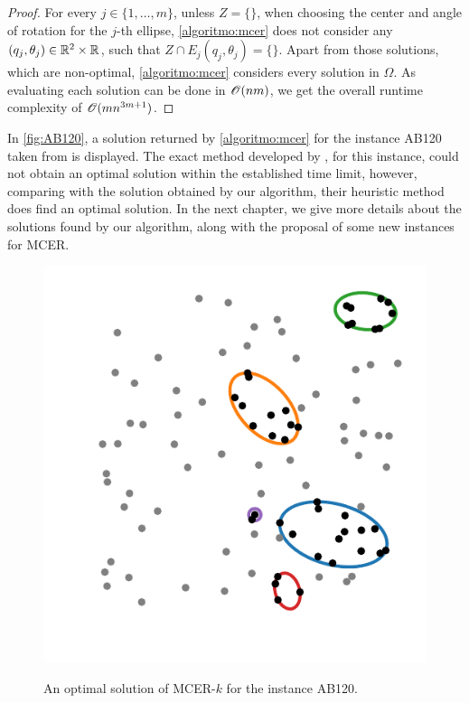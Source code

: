 \begin{proof}
	For every $j\in\{1, \dots, m\}$, unless $Z=\{\}$, when choosing the center and angle of rotation for the $j$-th ellipse, \autoref{algoritmo:mcer} does not consider any $(q_j, \theta_j) \in \mathbb{R}^2 \times \mathbb{R}$, such that $Z \cap E_j(q_j, \theta_j) = \{\}$. Apart from those solutions, which are non-optimal, \autoref{algoritmo:mcer} considers every solution in $\Omega$. As evaluating each solution can be done in $\mathscr{O}(nm)$, we get the overall runtime complexity of $\mathscr{O}(mn^{3m+1})$.
\end{proof}

In \autoref{fig:AB120}, a solution returned by \autoref{algoritmo:mcer} for the instance AB120 taken from  is displayed. The exact method developed by , for this instance, could not obtain an optimal solution within the established time limit, however, comparing with the solution obtained by our algorithm, their heuristic method does find an optimal solution. In the next chapter, we give more details about the solutions found by our algorithm, along with the proposal of some new instances for MCER.


\begin{figure}[!htb]
	\centering
	\caption{An optimal solution of MCER-$k$ for the instance AB120.}
	\includegraphics[scale=.8]{tex/figures/AB120}
	\fautor
	\label{fig:AB120}
\end{figure}

